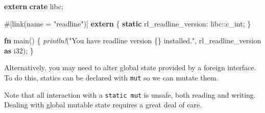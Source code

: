 \documentclass[a4paper,]{book}
\newenvironment{Shaded}{\begin{snugshade}}{\end{snugshade}}
\newcommand{\KeywordTok}[1]{\textcolor[rgb]{0.13,0.29,0.53}{\textbf{{#1}}}}
\newcommand{\DataTypeTok}[1]{\textcolor[rgb]{0.13,0.29,0.53}{{#1}}}
\newcommand{\StringTok}[1]{\textcolor[rgb]{0.31,0.60,0.02}{{#1}}}
\newcommand{\PreprocessorTok}[1]{\textcolor[rgb]{0.56,0.35,0.01}{\textit{{#1}}}}
\newcommand{\AttributeTok}[1]{\textcolor[rgb]{0.77,0.63,0.00}{{#1}}}
\newcommand{\NormalTok}[1]{{#1}}
\begin{document}
\begin{Shaded}
\begin{Highlighting}[]
\KeywordTok{extern} \KeywordTok{crate} \NormalTok{libc;}

\AttributeTok{#[}\NormalTok{link}\AttributeTok{(}\NormalTok{name }\AttributeTok{=} \StringTok{"readline"}\AttributeTok{)]}
\KeywordTok{extern} \NormalTok{\{}
    \KeywordTok{static} \NormalTok{rl_readline_version: libc::}\DataTypeTok{c_int}\NormalTok{;}
\NormalTok{\}}

\KeywordTok{fn} \NormalTok{main() \{}
    \PreprocessorTok{println!}\NormalTok{(}\StringTok{"You have readline version \{\} installed."}\NormalTok{,}
             \NormalTok{rl_readline_version }\KeywordTok{as} \DataTypeTok{i32}\NormalTok{);}
\NormalTok{\}}
\end{Highlighting}
\end{Shaded}

Alternatively, you may need to alter global state provided by a foreign
interface. To do this, statics can be declared with \texttt{mut} so we
can mutate them.

\begin{Shaded}
\end{Shaded}

Note that all interaction with a \texttt{static\ mut} is unsafe, both
reading and writing. Dealing with global mutable state requires a great
deal of care.
\end{document}
